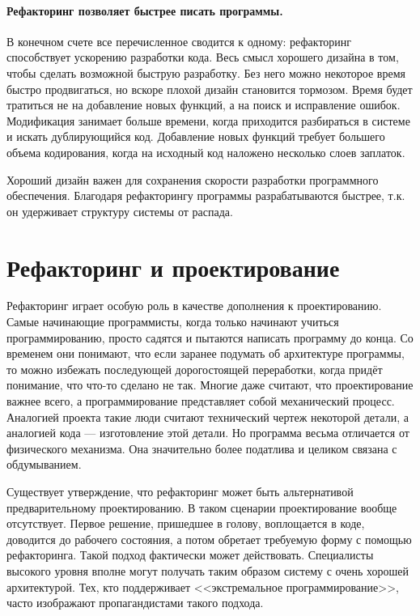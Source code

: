 \documentclass{../../text-style}
\begin{document}
\paragraph{Рефакторинг позволяет быстрее писать программы.} В конечном счете все перечисленное сводится к одному: рефакторинг способствует ускорению разработки кода. Весь смысл хорошего дизайна в том, чтобы сделать возможной быструю разработку. Без него можно некоторое время быстро продвигаться, но вскоре плохой дизайн становится тормозом. Время будет тратиться не на добавление новых функций, а на поиск и исправление ошибок. Модификация занимает больше времени, когда приходится разбираться в системе и искать дублирующийся код. Добавление новых функций требует большего объема кодирования, когда на исходный код наложено несколько слоев заплаток.

Хороший дизайн важен для сохранения скорости разработки программного обеспечения. Благодаря рефакторингу программы разрабатываются быстрее, т.к. он удерживает структуру системы от распада.

\section{Рефакторинг и проектирование}

Рефакторинг играет особую роль в качестве дополнения к проектированию. Самые начинающие программисты, когда только начинают учиться программированию, просто садятся и пытаются написать программу до конца. Со временем они понимают, что если заранее подумать об архитектуре программы, то можно избежать последующей дорогостоящей переработки, когда придёт понимание, что что-то сделано не так. Многие даже считают, что проектирование важнее всего, а программирование представляет собой механический процесс. Аналогией проекта такие люди считают технический чертеж некоторой детали, а аналогией кода --- изготовление этой детали. Но программа весьма отличается от физического механизма. Она значительно более податлива и целиком связана с обдумыванием.

Существует утверждение, что рефакторинг может быть альтернативой предварительному проектированию. В таком сценарии проектирование вообще отсутствует. Первое решение, пришедшее в голову, воплощается в коде, доводится до рабочего состояния, а потом обретает требуемую форму с помощью рефакторинга. Такой подход фактически может действовать. Специалисты высокого уровня вполне могут получать таким образом систему с очень хорошей архитектурой. Тех, кто поддерживает <<экстремальное программирование>>, часто изображают пропагандистами такого подхода.
\end{document}
